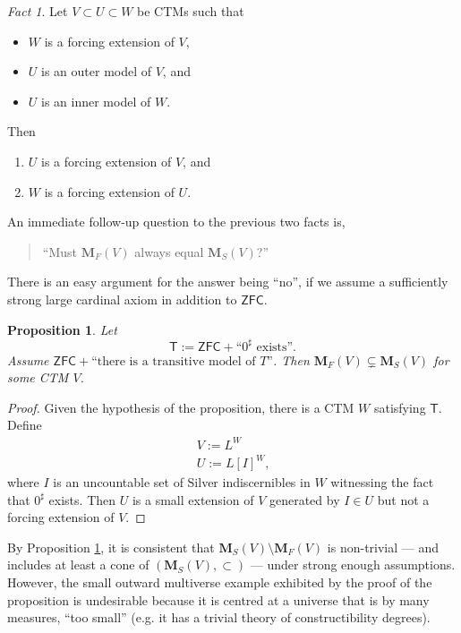 \documentclass[12pt, twoside]{memoir}
\numberwithin{equation}{section}
\newtheorem{prop}[thm]{Proposition}
\theoremstyle{definition}
\theoremstyle{remark}
\newtheorem{fact}[thm]{Fact}
\theoremstyle{definition}
\theoremstyle{definition}
\theoremstyle{definition}
\theoremstyle{remark}
\begin{document}
\begin{fact}\label{fact221}
Let $V \subset U \subset W$ be CTMs such that
\begin{itemize}
    \item $W$ is a forcing extension of $V$, 
    \item $U$ is an outer model of $V$, and
    \item $U$ is an inner model of $W$.
\end{itemize}
Then 
\begin{enumerate}[label=(\alph*)]
    \item $U$ is a forcing extension of $V$, and
    \item $W$ is a forcing extension of $U$.
\end{enumerate}
\end{fact}

An immediate follow-up question to the previous two facts is, 
\begin{quote}
    ``Must $\mathbf{M}_F(V)$ always equal $\mathbf{M}_S(V)$?''
\end{quote}
There is an easy argument for the answer being ``no'', if we assume a sufficiently strong large cardinal axiom in addition to $\mathsf{ZFC}$.

\begin{prop}\label{prop318}
Let 
\begin{equation*}
    \mathsf{T} := \mathsf{ZFC} + \text{``}0^{\sharp}\text{ exists''.}
\end{equation*} 
Assume $\mathsf{ZFC} + \text{``there is a transitive model of } T \text{''}$. Then $\mathbf{M}_F(V) \subsetneq \mathbf{M}_S(V)$ for some CTM $V$.
\end{prop}

\begin{proof}
Given the hypothesis of the proposition, there is a CTM $W$ satisfying $\mathsf{T}$. Define 
\begin{gather*}
    V := L^W \\
    U := L[I]^W \text{,}
\end{gather*}
where $I$ is an uncountable set of Silver indiscernibles in $W$ witnessing the fact that $0^{\sharp}$ exists. Then $U$ is a small extension of $V$ generated by $I \in U$ but not a forcing extension of $V$.
\end{proof}

By Proposition \ref{prop318}, it is consistent that $\mathbf{M}_S(V) \setminus \mathbf{M}_F(V)$ is non-trivial --- and includes at least a cone of $(\mathbf{M}_S(V), \subset)$ --- under strong enough assumptions. However, the small outward multiverse example exhibited by the proof of the proposition is undesirable because it is centred at a universe that is by many measures, ``too small'' (e.g. it has a trivial theory of constructibility degrees). 
\end{document}
